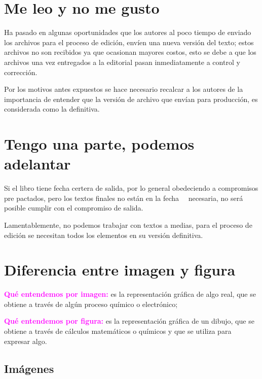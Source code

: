 \documentclass{book}
\begin{document}
{{{{\section{Me leo y no me gusto}

Ha pasado en algunas oportunidades que los autores al poco tiempo de enviado los archivos para el proceso de edición, envíen una nueva versión del texto; estos archivos no son recibidos ya que ocasionan mayores costos, esto se debe a que los archivos una vez entregados a la editorial pasan inmediatamente a control y corrección.

Por los motivos antes expuestos se hace necesario recalcar a los autores de la importancia de entender que la versión de archivo que envían para producción, es considerada como la definitiva.

\section{Tengo una parte, podemos adelantar}

Si el libro tiene fecha certera de salida, por lo general obedeciendo a compromisos pre pactados, pero los textos finales no están en la fecha \ \rdash \ necesaria, no será posible cumplir con el compromiso de salida.

Lamentablemente, no podemos trabajar con textos a medias, para el proceso de edición se necesitan todos los elementos en su versión definitiva.

\section{Diferencia entre imagen y figura}

\begin{compactdesc}
\item [\textcolor{magenta}{\textbf{Qué entendemos por imagen:}}] es la representación gráfica de algo real, que se obtiene a través de  algún proceso químico o electrónico;
\item [\textcolor{magenta}{\textbf{Qué entendemos por figura:}}] es la representación gráfica de un dibujo, que se obtiene a través de cálculos matemáticos o químicos y que se utiliza para expresar algo.
\end{compactdesc}

\subsection{Imágenes}

}}}}
\end{document}
